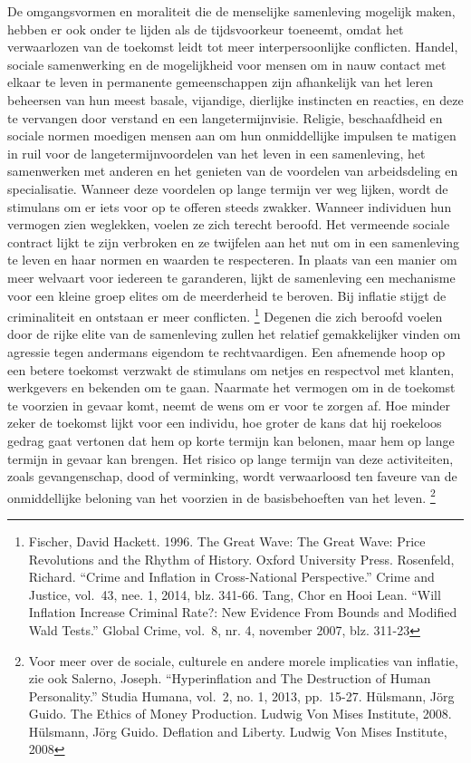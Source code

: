 \documentclass[
  a5paper,
  smalldemyvopaper,11pt,twoside,onecolumn,openright,extrafontsizes,
hidelinks]{memoir}
\begin{document}
De omgangsvormen en moraliteit die de menselijke samenleving mogelijk
maken, hebben er ook onder te lijden als de tijdsvoorkeur toeneemt,
omdat het verwaarlozen van de toekomst leidt tot meer interpersoonlijke
conflicten. Handel, sociale samenwerking en de mogelijkheid voor mensen
om in nauw contact met elkaar te leven in permanente gemeenschappen zijn
afhankelijk van het leren beheersen van hun meest basale, vijandige,
dierlijke instincten en reacties, en deze te vervangen door verstand en
een langetermijnvisie. Religie, beschaafdheid en sociale normen moedigen
mensen aan om hun onmiddellijke impulsen te matigen in ruil voor de
langetermijnvoordelen van het leven in een samenleving, het samenwerken
met anderen en het genieten van de voordelen van arbeidsdeling en
specialisatie. Wanneer deze voordelen op lange termijn ver weg lijken,
wordt de stimulans om er iets voor op te offeren steeds zwakker. Wanneer
individuen hun vermogen zien weglekken, voelen ze zich terecht beroofd.
Het vermeende sociale contract lijkt te zijn verbroken en ze twijfelen
aan het nut om in een samenleving te leven en haar normen en waarden te
respecteren. In plaats van een manier om meer welvaart voor iedereen te
garanderen, lijkt de samenleving een mechanisme voor een kleine groep
elites om de meerderheid te beroven. Bij inflatie stijgt de
criminaliteit en ontstaan er meer conflicten. \footnote{Fischer, David
  Hackett. 1996. The Great Wave: The Great Wave: Price Revolutions and
  the Rhythm of History. Oxford University Press. Rosenfeld, Richard.
  ``Crime and Inflation in Cross-National Perspective.'' Crime and
  Justice, vol.~43, nee. 1, 2014, blz. 341-66. Tang, Chor en Hooi Lean.
  ``Will Inflation Increase Criminal Rate?: New Evidence From Bounds and
  Modified Wald Tests.'' Global Crime, vol.~8, nr. 4, november 2007,
  blz. 311-23} Degenen die zich beroofd voelen door de rijke elite van
de samenleving zullen het relatief gemakkelijker vinden om agressie
tegen andermans eigendom te rechtvaardigen. Een afnemende hoop op een
betere toekomst verzwakt de stimulans om netjes en respectvol met
klanten, werkgevers en bekenden om te gaan. Naarmate het vermogen om in
de toekomst te voorzien in gevaar komt, neemt de wens om er voor te
zorgen af. Hoe minder zeker de toekomst lijkt voor een individu, hoe
groter de kans dat hij roekeloos gedrag gaat vertonen dat hem op korte
termijn kan belonen, maar hem op lange termijn in gevaar kan brengen.
Het risico op lange termijn van deze activiteiten, zoals gevangenschap,
dood of verminking, wordt verwaarloosd ten faveure van de onmiddellijke
beloning van het voorzien in de basisbehoeften van het leven.
\footnote{Voor meer over de sociale, culturele en andere morele
  implicaties van inflatie, zie ook Salerno, Joseph. ``Hyperinflation
  and The Destruction of Human Personality.'' Studia Humana, vol.~2, no.
  1, 2013, pp.~15-27. Hülsmann, Jörg Guido. The Ethics of Money
  Production. Ludwig Von Mises Institute, 2008. Hülsmann, Jörg Guido.
  Deflation and Liberty. Ludwig Von Mises Institute, 2008}
\end{document}
